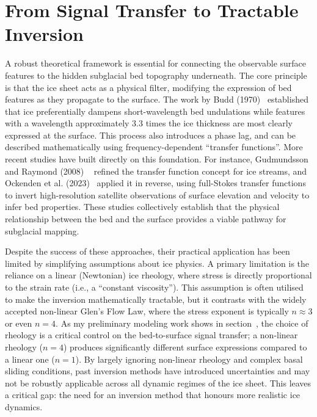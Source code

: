 \section{From Signal Transfer to Tractable Inversion}\label{theoretical_frameworks}
A robust theoretical framework is essential for connecting the observable surface features to the hidden subglacial bed topography underneath. The core principle is that the ice sheet acts as a physical filter, modifying the expression of bed features as they propagate to the surface. The work by Budd (1970)~\cite{Budd_1970} established that ice preferentially dampens short-wavelength bed undulations while features with a wavelength approximately $3.3$ times the ice thickness are most clearly expressed at the surface. This process also introduces a phase lag, and can be described mathematically using frequency-dependent ``transfer functions''. More recent studies have built directly on this foundation. For instance, Gudmundsson and Raymond (2008) ~\cite{Gudmundsson_2008} refined the transfer function concept for ice streams, and Ockenden et al. (2023)~\cite{Ockenden_2023} applied it in reverse, using full-Stokes transfer functions to invert high-resolution satellite observations of surface elevation and velocity to infer bed properties. These studies collectively establish that the physical relationship between the bed and the surface provides a viable pathway for subglacial mapping.

Despite the success of these approaches, their practical application has been limited by simplifying assumptions about ice physics. A primary limitation is the reliance on a linear (Newtonian) ice rheology, where stress is directly proportional to the strain rate (i.e., a ``constant viscosity''). This assumption is often utilised to make the inversion mathematically tractable, but it contrasts with the widely accepted non-linear Glen's Flow Law, where the stress exponent is typically 
$n \approx 3$ or even $n = 4$. As my preliminary modeling work shows in section~\cite{study1}, the choice of rheology is a critical control on the bed-to-surface signal transfer; a non-linear rheology ($n = 4$) produces significantly different surface expressions compared to a linear one ($n = 1$). By largely ignoring non-linear rheology and complex basal sliding conditions, past inversion methods have introduced uncertainties and may not be robustly applicable across all dynamic regimes of the ice sheet. This leaves a critical gap: the need for an inversion method that honours more realistic ice dynamics.

